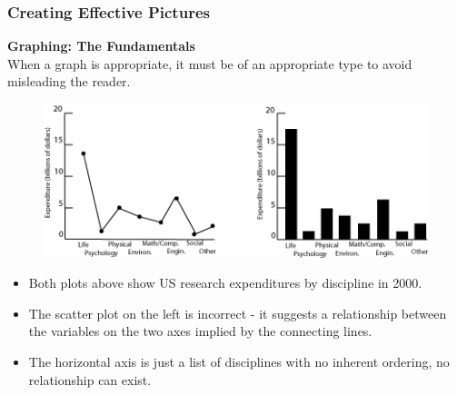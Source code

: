 \documentclass{beamer}
\begin{document}

\begin{frame}
\frametitle{Creating Effective Pictures}
\textbf{Graphing: The Fundamentals}\\
\vspace{0.2cm}
When a graph is appropriate, it must be of an appropriate type to avoid misleading the reader.
\begin{figure}
\includegraphics[scale=0.45]{bad_graph}
\end{figure}
\vspace{-0.5cm}
\begin{itemize}
\item Both plots above show US research expenditures by discipline in 2000.
\item The scatter plot on the left is incorrect - it suggests a relationship between the variables on the two axes implied by the connecting lines.
\item The horizontal axis is just a list of disciplines with no inherent ordering, no relationship can exist.
\end{itemize}
\end{frame}
\end{document}
